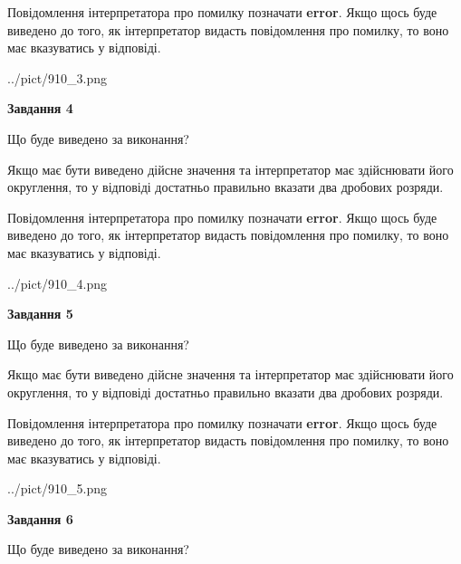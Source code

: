 \documentclass[12pt, ukrainian]{article}
\begin{document}
{\begin {Large}
Повідомлення інтерпретатора про помилку позначати \textbf{error}.
Якщо щось буде виведено до того, як інтерпретатор видасть повідомлення про помилку, 
то воно має вказуватись у відповіді. \par

\begin{center}
	{../pict/910_3.png}
\end{center}
\newpage

{\begin {center}\textbf{Завдання 4}\end {center}}\par
Що буде виведено за виконання? \par

Якщо має бути виведено дійсне значення та інтерпретатор має здійснювати його округлення, 
то у відповіді достатньо правильно вказати два дробових розряди.

Повідомлення інтерпретатора про помилку позначати \textbf{error}.
Якщо щось буде виведено до того, як інтерпретатор видасть повідомлення про помилку, 
то воно має вказуватись у відповіді. \par

\begin{center}
	{../pict/910_4.png}
\end{center}
\newpage

{\begin {center}\textbf{Завдання 5}\end {center}}\par
Що буде виведено за виконання? \par

Якщо має бути виведено дійсне значення та інтерпретатор має здійснювати його округлення, 
то у відповіді достатньо правильно вказати два дробових розряди.

Повідомлення інтерпретатора про помилку позначати \textbf{error}.
Якщо щось буде виведено до того, як інтерпретатор видасть повідомлення про помилку, 
то воно має вказуватись у відповіді. \par

\begin{center}
	{../pict/910_5.png}
\end{center}
\newpage

{\begin {center}\textbf{Завдання 6}\end {center}}\par
Що буде виведено за виконання? \par


\end{Large}}
\end{document}

